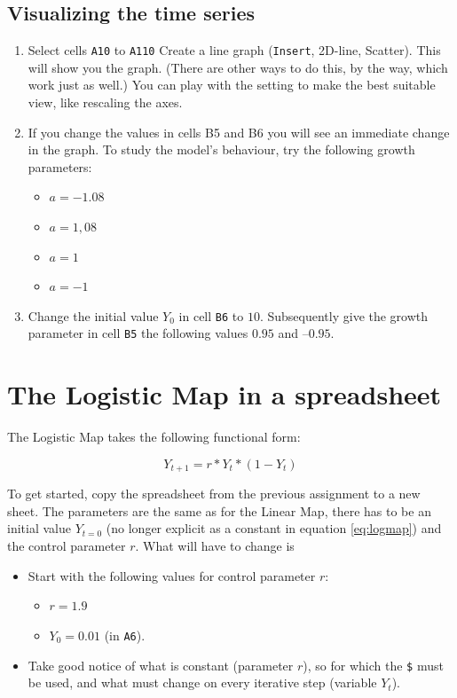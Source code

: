 \documentclass[]{book}
\providecommand{\tightlist}{%
  \setlength{\itemsep}{0pt}\setlength{\parskip}{0pt}}
\let\stdsection\section
\renewcommand\section{\newpage\stdsection}
\begin{document}
\subsection{Visualizing the time
series}\label{visualizing-the-time-series}

\begin{enumerate}
\item
  Select cells \texttt{A10} to \texttt{A110} Create a line graph
  (\texttt{Insert}, 2D-line, Scatter). This will show you the graph.
  (There are other ways to do this, by the way, which work just as
  well.) You can play with the setting to make the best suitable view,
  like rescaling the axes.
\item
  If you change the values in cells B5 and B6 you will see an immediate
  change in the graph. To study the model's behaviour, try the following
  growth parameters:

  \begin{itemize}
  \tightlist
  \item
    \(a = -1.08\)
  \item
    \(a = 1,08\)
  \item
    \(a = 1\)
  \item
    \(a = -1\)
  \end{itemize}
\item
  Change the initial value \(Y_0\) in cell \texttt{B6} to \(10\).
  Subsequently give the growth parameter in cell \texttt{B5} the
  following values \(0.95\) and \(–0.95\).
\end{enumerate}

\section{The Logistic Map in a
spreadsheet}\label{the-logistic-map-in-a-spreadsheet}

The Logistic Map takes the following functional form:

\begin{equation}
Y_{t+1} = r*Y_t*(1-Y_t)
\label{eq:logmap}
\end{equation}

To get started, copy the spreadsheet from the previous assignment to a
new sheet. The parameters are the same as for the Linear Map, there has
to be an initial value \(Y_{t=0}\) (no longer explicit as a constant in
equation \eqref{eq:logmap}) and the control parameter \(r\). What will
have to change is

\begin{itemize}
\tightlist
\item
  Start with the following values for control parameter \(r\):

  \begin{itemize}
  \tightlist
  \item
    \(r = 1.9\)
  \item
    \(Y_0 = 0.01\) (in \texttt{A6}).
  \end{itemize}
\item
  Take good notice of what is constant (parameter \(r\)), so for which
  the \texttt{\$} must be used, and what must change on every iterative
  step (variable \(Y_t\)).
\end{itemize}
\end{document}
